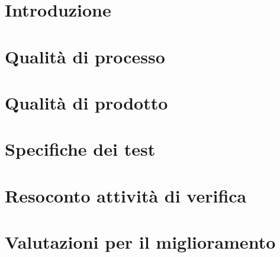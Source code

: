 \documentclass{article}
\begin{document}


\newpage
\section{Introduzione}%
\label{sec:introduzione}


\newpage
\section{Qualità di processo}%
\label{sec:qualita_di_processo}


\newpage
\section{Qualità di prodotto}%
\label{sec:qualita_di_prodotto}


\newpage
\section{Specifiche dei test}%
\label{sec:qualita_di_prodotto}


\appendix
\newpage
\section{Resoconto attività di verifica}%
\label{sec:resoconto_attivita_di_verifica}


\newpage
\section{Valutazioni per il miglioramento}%
\label{sec:valutazioni_per_il_miglioramento}

\end{document}
